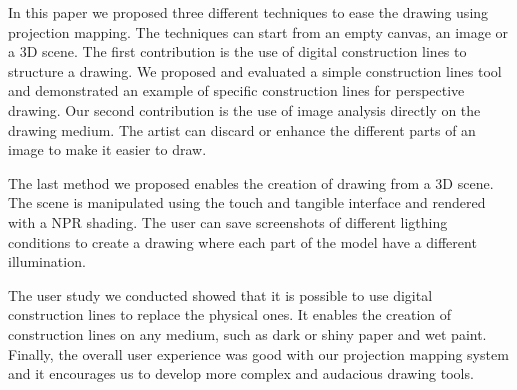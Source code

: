 \documentclass{sigchi}
\begin{document}
In this paper we proposed three different techniques to ease the
drawing using projection mapping. The techniques can start from an
empty canvas, an image or a 3D scene. 
The first contribution is the use of digital construction lines to
structure a drawing. We proposed and evaluated a simple construction
lines tool and demonstrated an example of specific construction lines
for perspective drawing. 
Our second contribution is the use of image analysis directly on the
drawing medium. The artist can discard or enhance the different parts
of an image to make it easier to draw. 

The last method we proposed enables the creation of drawing from a 3D
scene. The scene is manipulated using the touch and tangible interface
and rendered with a NPR shading. The user can save screenshots of
different ligthing conditions to create a drawing where each part of
the model have a different illumination. 
 

The user study we conducted showed that it is possible to use digital
construction lines to replace the physical ones. It enables the
creation of construction lines on any medium, such as dark or shiny
paper and wet paint. 
Finally, the overall user experience was good with our projection
mapping system and it encourages us to develop more complex and
audacious drawing tools. 





\balance

\small


\end{document}
